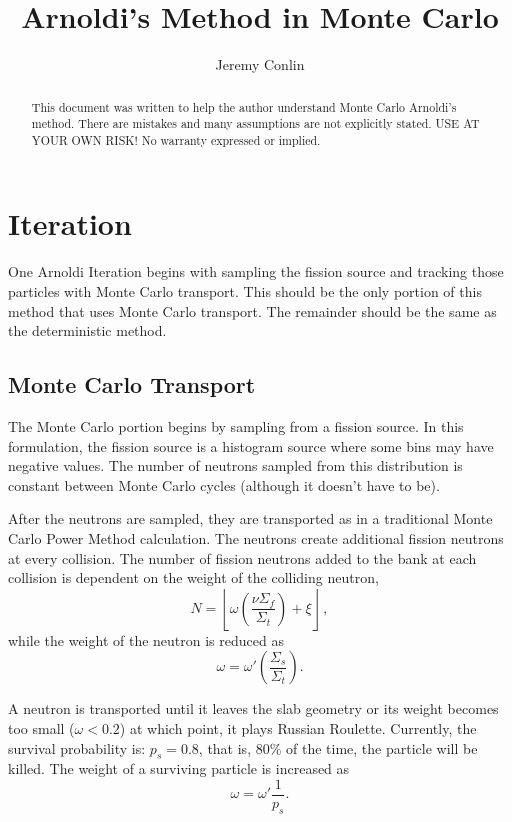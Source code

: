 \documentclass[12pt]{article}
\author{Jeremy Conlin}
\title{Arnoldi's Method in Monte Carlo}
\begin{document}
\maketitle

\begin{abstract}
This document was written to help the author understand Monte Carlo Arnoldi's method.  There are mistakes and many assumptions are not explicitly stated.  USE AT YOUR OWN RISK! No warranty expressed or implied.
\end{abstract}

\section{Iteration}
One Arnoldi Iteration begins with sampling the fission source and tracking those particles with Monte Carlo transport.  This should be the only portion of this method that uses Monte Carlo transport.  The remainder should be the same as the deterministic method.

\subsection{Monte Carlo Transport}
The Monte Carlo portion begins by sampling from a fission source.  In this formulation, the fission source is a histogram source where some bins may have negative values.  The number of neutrons sampled from this distribution is constant between Monte Carlo cycles (although it doesn't have to be).  

After the neutrons are sampled, they are transported as in a traditional Monte Carlo Power Method calculation.  The neutrons create additional fission neutrons at every collision.  The number of fission neutrons added to the bank at each collision is dependent on the weight of the colliding neutron,
\begin{equation} \label{eq:num-fission}
    N = \left\lfloor\omega\left(\frac{\nu\Sigma_f}{\Sigma_t}\right) + \xi\right\rfloor\,,
\end{equation}
while the weight of the neutron is reduced as
\begin{equation}
    \omega = \omega'\left(\frac{\Sigma_s}{\Sigma_t}\right).
\end{equation}

A neutron is transported until it leaves the slab geometry or its weight becomes too small ($\omega < 0.2$) at which point, it plays Russian Roulette.  Currently, the survival probability is: $p_s = 0.8$, that is, 80\% of the time, the particle will be killed.  The weight of a surviving particle is increased as
\begin{equation}
    \omega = \omega'\frac{1}{p_s}.
\end{equation}
\end{document}
